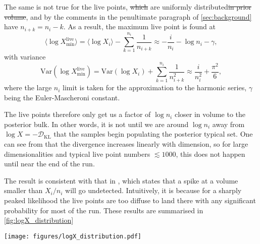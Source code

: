 \documentclass[usenatbib]{mnras}
\newcommand{\nlive}{n_i}
\newcommand{\DKL}{\mathcal{D}_\mathrm{KL}}
\providecommand{\DIFaddtex}[1]{{\protect\color{blue}\uwave{#1}}} %
\providecommand{\DIFdeltex}[1]{{\protect\color{red}\sout{#1}}}                      %
\providecommand{\DIFaddbegin}{} %
\providecommand{\DIFaddend}{} %
\providecommand{\DIFdelbegin}{} %
\providecommand{\DIFdelend}{} %
\providecommand{\DIFadd}[1]{\texorpdfstring{\DIFaddtex{#1}}{#1}} %
\providecommand{\DIFdel}[1]{\texorpdfstring{\DIFdeltex{#1}}{}} %
\newcommand{\DIFscaledelfig}{0.5}
\newlength{\DIFdelgraphicswidth} %
\newlength{\DIFdelgraphicsheight} %
\newcommand{\DIFaddincludegraphics}[2][]{{\color{blue}\fbox{\DIFOincludegraphics[#1]{#2}}}} %
\newcommand{\DIFdelincludegraphics}[2][]{%
\sbox{\DIFdelgraphicsbox}{\DIFOincludegraphics[#1]{#2}}%
\settoboxwidth{\DIFdelgraphicswidth}{\DIFdelgraphicsbox} %
\settoboxtotalheight{\DIFdelgraphicsheight}{\DIFdelgraphicsbox} %
\scalebox{\DIFscaledelfig}{%
\parbox[b]{\DIFdelgraphicswidth}{\usebox{\DIFdelgraphicsbox}\\[-\baselineskip] \rule{\DIFdelgraphicswidth}{0em}}\llap{\resizebox{\DIFdelgraphicswidth}{\DIFdelgraphicsheight}{%
\setlength{\unitlength}{\DIFdelgraphicswidth}%
\begin{picture}(1,1)%
\thicklines\linethickness{2pt} %
{\color[rgb]{1,0,0}\put(0,0){\framebox(1,1){}}}%
{\color[rgb]{1,0,0}\put(0,0){\line( 1,1){1}}}%
{\color[rgb]{1,0,0}\put(0,1){\line(1,-1){1}}}%
\end{picture}%
}\hspace*{3pt}}} %
} %
\DeclareRobustCommand{\DIFaddbegin}{\DIFOaddbegin \let\includegraphics\DIFaddincludegraphics} %
\DeclareRobustCommand{\DIFaddend}{\DIFOaddend \let\includegraphics\DIFOincludegraphics} %
\DeclareRobustCommand{\DIFdelbegin}{\DIFOdelbegin \let\includegraphics\DIFdelincludegraphics} %
\DeclareRobustCommand{\DIFdelend}{\DIFOaddend \let\includegraphics\DIFOincludegraphics} %
\begin{document}
\par
The same is not true for the live points, \DIFdelbegin \DIFdel{which }\DIFdelend \DIFaddbegin \DIFadd{whose enclosed prior volume values }\DIFaddend are uniformly distributed\DIFdelbegin \DIFdel{in prior volume}\DIFdelend , and by the comments in the penultimate paragraph of \cref{sec:background} have ${n_{i+k} = n_i-k}$. As a result, the maximum live point is found at 
\begin{equation}\label{eq:Xmin}
    \langle\log X_\mathrm{min}^{\mathrm{live}}\rangle = \langle\log X_i\rangle - \sum_{k=1}^{\nlive} \frac{1}{n_{i+k}} \approx -\frac{i}{\nlive} - \log \nlive - \gamma,
\end{equation}
with variance
\begin{equation}
    \mathrm{Var}(\log X_\mathrm{min}^{\mathrm{live}}) = \mathrm{Var}(\log X_i) + \sum_{k=1}^{\nlive} \frac{1}{n_{i+k}^2} \approx \frac{i}{\nlive^2} + \frac{\pi^2}{6}, 
\end{equation}
where the large $\nlive$ limit is taken for the approximation to the harmonic series, $\gamma$ being the Euler-Mascheroni constant.
\par
The live points therefore only get us a factor of $\log \nlive$ closer in volume to the posterior bulk. In other words, it is not until we are around $\log \nlive$ away from $\log X = -\DKL$ that the samples begin populating the posterior typical set. One can see from \DIFdelbegin %
\DIFdelend \DIFaddbegin \DIFadd{\mbox{%
\cref{eq:DKL} }\hspace{0pt}%
}\DIFaddend that the divergence increases linearly with dimension, so for large dimensionalities and typical live point numbers $\lesssim 1000$, this does not happen until near the end of the run.
\par
The result is consistent with that in \citet{statmech}, which states that a spike at a volume smaller than $X_i/n_i$ will go undetected. Intuitively, it is because for a sharply peaked likelihood the live points are too diffuse to land there with any significant probability for most of the run. These results are summarised in \cref{fig:logX_distribution}
\begin{figure*}
\begin{center}
    \texttt{[image: figures/logX\_distribution.pdf]}
\end{center}
\caption{The distribution of the posterior mass in terms of $\log X$, the live points over the constrained prior and the smallest live point prior volume $\log X_\mathrm{min}^{\mathrm{live}}$ at an intermediate iteration $i$. For large values of $\DKL$ i.e. informative posteriors and/or large dimensionalities, the maximum live point is very far from the posterior bulk until the very end of the run. Note that the x-axis in this plot is $\log X$, so that the run proceeds from right to left to emphasise that the enclosed prior volume iteratively gets smaller. Plots of the sort from here onward will be in terms of $-\log X$, where the run will more naturally proceed from left to right. }
\label{fig:logX_distribution}
\end{figure*}
\end{document}

